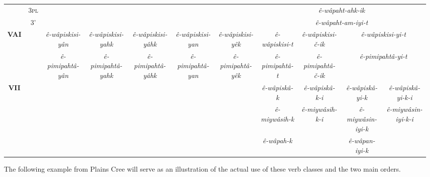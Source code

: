 \documentclass[twoside,a4paper,11pt]{article}
\newcommand{\ipa}[1]{{\phon\textit{#1}}}
\newcommand{\pl}{\textsc{pl}}
\newcommand{\grise}[1]{\cellcolor{lightgray}\textbf{#1}}
\begin{document}
\begin{landscape}
\begin{table}[H]
{\begin{tabular}{ccccccccccc}
& 3\pl   & \grise{} & \grise{} & \grise{}  & \grise{}  & \grise{}  & \multicolumn{4}{c}{\ipa{ê-wâpaht-ahk-ik} }  \\ 
& 3'  &\grise{}  & \grise{}  & \grise{}  &\grise{}  &  \grise{}  &\multicolumn{4}{c}{\ipa{ê-wâpaht-am-iyi-t} }\\ 
\bottomrule
\multirow{2}{*}{\textbf{VAI}}  &  & \ipa{ê-wâpiskisi-yân} & \ipa{ê-wâpiskisi-yahk} & \ipa{ê-wâpiskisi-yâhk} &\ipa{ê-wâpiskisi-yan} &\ipa{ê-wâpiskisi-yêk} & \ipa{ê-wâpiskisi-t} & \ipa{ê-wâpiskisi-č-ik} & \multicolumn{2}{c}{\ipa{ê-wâpiskisi-yi-t}} \\
& & \ipa{ê-pimipahtâ-yân} & \ipa{ ê-pimipahtâ-yahk} & \ipa{ê-pimipahtâ-yâhk} &\ipa{ ê-pimipahtâ-yan} &\ipa{ ê-pimipahtâ-yêk} & \ipa{ê-pimipahtâ-t} & \ipa{ê-pimipahtâ-č-ik} & \multicolumn{2}{c}{\ipa{ê-pimipahtâ-yi-t}}\\
\bottomrule
\multirow{2}{*}{\textbf{VII}} &  &  \grise{}  &  \grise{}  &  \grise{} & \grise{}  & \grise{}  & \ipa{ê-wâpiskâ-k} & \ipa{ê-wâpiskâ-k-i} & \ipa{ê-wâpiskâ-yi-k} & \ipa{ê-wâpiskâ-yi-k-i}\\
 & &  \grise{}  &  \grise{}  &  \grise{} & \grise{}  & \grise{}  & \ipa{ê-miywâsih-k} & \ipa{ê-miywâsih-k-i}& \ipa{ê-miywâsin-iyi-k} & \ipa{ê-miywâsin-iyi-k-i}\\
  & &  \grise{}  &  \grise{}  &  \grise{} & \grise{}  & \grise{}  & \ipa{ê-wâpah-k} &\grise{} & \ipa{ê-wâpan-iyi-k} & \grise{}\\
 \bottomrule
\end{tabular}}
\end{table}

\end{landscape}

The following example from Plains Cree will serve as an illustration of the actual use of these verb classes and the two main orders.
\end{document}
